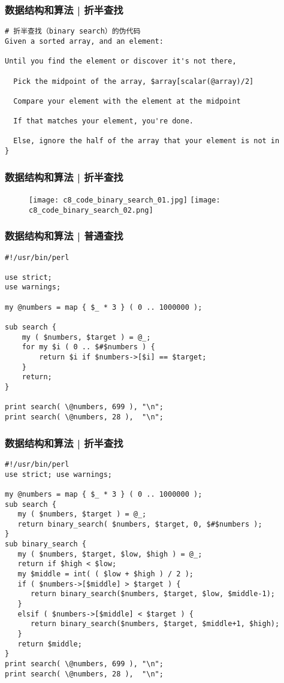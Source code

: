 \begin{frame}[fragile]
  \frametitle{数据结构和算法 | 折半查找}
\begin{lstlisting}[basicstyle=\small\tt]
# 折半查找（binary search）的伪代码
Given a sorted array, and an element:

Until you find the element or discover it's not there,

  Pick the midpoint of the array, $array[scalar(@array)/2]

  Compare your element with the element at the midpoint

  If that matches your element, you're done.

  Else, ignore the half of the array that your element is not in
}
\end{lstlisting}
\end{frame}

\begin{frame}
  \frametitle{数据结构和算法 | 折半查找}
  \begin{figure}
    \centering
    \texttt{[image: c8\_code\_binary\_search\_01.jpg]}
    \texttt{[image: c8\_code\_binary\_search\_02.png]}
  \end{figure}
\end{frame}

\begin{frame}[fragile]
  \frametitle{数据结构和算法 | 普通查找}
\begin{lstlisting}[basicstyle=\small\tt]
#!/usr/bin/perl

use strict;
use warnings;

my @numbers = map { $_ * 3 } ( 0 .. 1000000 );

sub search {
    my ( $numbers, $target ) = @_;
    for my $i ( 0 .. $#$numbers ) {
        return $i if $numbers->[$i] == $target;
    }
    return;
}

print search( \@numbers, 699 ), "\n";
print search( \@numbers, 28 ),  "\n";
\end{lstlisting}
\end{frame}

\begin{frame}[fragile]
  \frametitle{数据结构和算法 | 折半查找}
\begin{lstlisting}[basicstyle=\scriptsize\tt,numberstyle=\tiny]
#!/usr/bin/perl
use strict; use warnings;

my @numbers = map { $_ * 3 } ( 0 .. 1000000 );
sub search {
   my ( $numbers, $target ) = @_;
   return binary_search( $numbers, $target, 0, $#$numbers );
}
sub binary_search {
   my ( $numbers, $target, $low, $high ) = @_;
   return if $high < $low;
   my $middle = int( ( $low + $high ) / 2 );
   if ( $numbers->[$middle] > $target ) {
      return binary_search($numbers, $target, $low, $middle-1);
   }
   elsif ( $numbers->[$middle] < $target ) {
      return binary_search($numbers, $target, $middle+1, $high);
   }
   return $middle;
}
print search( \@numbers, 699 ), "\n";
print search( \@numbers, 28 ),  "\n";
\end{lstlisting}
\end{frame}

